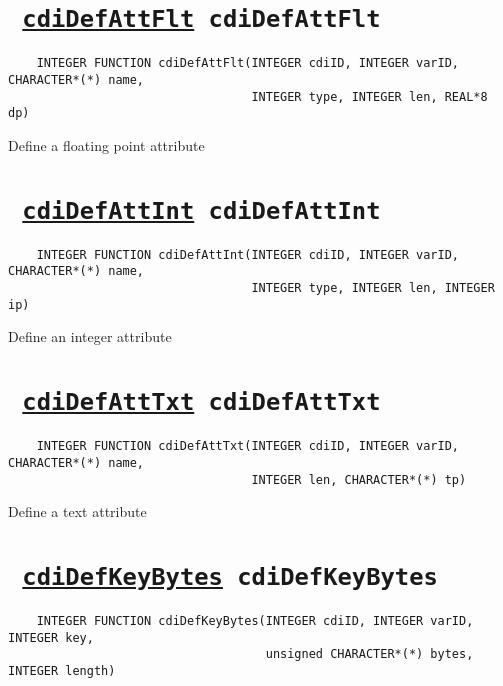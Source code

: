 

\section*{\texttt{ 
\ifpdf
\hyperref[cdiDefAttFlt]{cdiDefAttFlt}
\else
cdiDefAttFlt
\fi
}}
\begin{verbatim}
    INTEGER FUNCTION cdiDefAttFlt(INTEGER cdiID, INTEGER varID, CHARACTER*(*) name, 
                                  INTEGER type, INTEGER len, REAL*8 dp)
\end{verbatim}

Define a floating point attribute
\ifpdfoutput{}{(\ref{cdiDefAttFlt})}


\section*{\texttt{ 
\ifpdf
\hyperref[cdiDefAttInt]{cdiDefAttInt}
\else
cdiDefAttInt
\fi
}}
\begin{verbatim}
    INTEGER FUNCTION cdiDefAttInt(INTEGER cdiID, INTEGER varID, CHARACTER*(*) name, 
                                  INTEGER type, INTEGER len, INTEGER ip)
\end{verbatim}

Define an integer attribute
\ifpdfoutput{}{(\ref{cdiDefAttInt})}


\section*{\texttt{ 
\ifpdf
\hyperref[cdiDefAttTxt]{cdiDefAttTxt}
\else
cdiDefAttTxt
\fi
}}
\begin{verbatim}
    INTEGER FUNCTION cdiDefAttTxt(INTEGER cdiID, INTEGER varID, CHARACTER*(*) name, 
                                  INTEGER len, CHARACTER*(*) tp)
\end{verbatim}

Define a text attribute
\ifpdfoutput{}{(\ref{cdiDefAttTxt})}


\section*{\texttt{ 
\ifpdf
\hyperref[cdiDefKeyBytes]{cdiDefKeyBytes}
\else
cdiDefKeyBytes
\fi
}}
\begin{verbatim}
    INTEGER FUNCTION cdiDefKeyBytes(INTEGER cdiID, INTEGER varID, INTEGER key, 
                                    unsigned CHARACTER*(*) bytes, INTEGER length)
\end{verbatim}


